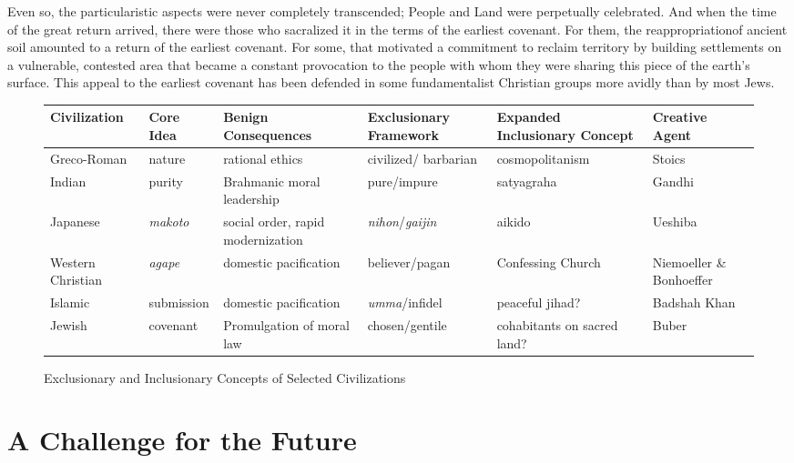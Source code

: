 Even so, the particularistic aspects were never completely transcended; People and Land were perpetually celebrated. And when the time of the great return arrived, there were those who sacralized it in the terms of the earliest covenant. For them, the reappropriationof ancient soil amounted to a return of the earliest covenant. For some, that motivated a commitment to reclaim territory by building settlements on a vulnerable, contested area that became a constant provocation to the people with whom they were sharing this piece of the earth's surface. This appeal to the earliest covenant has been defended in some fundamentalist Christian groups more avidly than by most Jews.

\begin{figure}
\caption{Exclusionary and Inclusionary Concepts of Selected Civilizations}
\scriptsize
\begin{adjustwidth}{-4em}{-4em}
\begin{center}
\begin{tabular}{ | C{.16\textwidth} | C{.16\textwidth} | C{.16\textwidth} | C{.16\textwidth} | C{.16\textwidth} | C{.16\textwidth} | }
\hline
\textbf{Civilization} & \textbf{Core Idea} & \textbf{Benign \mbox{Consequences}} & \textbf{Exclusionary Framework} & \textbf{Expanded Inclusionary Concept} & \textbf{Creative Agent} \\
\hline
Greco-Roman & nature & rational ethics & civilized/ barbarian & cosmo\-politanism & Stoics \\
\hline
Indian & purity & Brahmanic moral leadership & pure/impure & satyagraha & Gandhi \\
\hline
Japanese & \emph{makoto} & social order, rapid \mbox{modernization} & \emph{nihon}/\emph{gaijin} & aikido & Ueshiba \\
\hline
Western Christian & \emph{agape} & domestic pacification & believer/pagan & Confessing Church & Niemoeller \& Bonhoeffer \\
\hline
Islamic & submission & domestic pacification & \emph{umma}/infidel & peaceful jihad? & Badshah Khan \\
\hline
Jewish & covenant & \mbox{Promulgation} of moral law & chosen/gentile & cohabitants on sacred land? & Buber \\
\hline
\end{tabular}
\end{center}
\end{adjustwidth}
\end{figure}

\section*{A Challenge for the Future}

